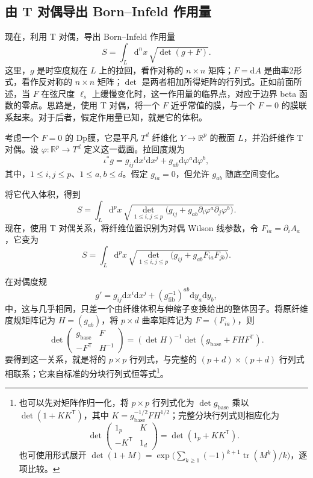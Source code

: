 \subsection{由 T 对偶导出 Born--Infeld 作用量}\label{sec:3.5.5}

现在，利用 T 对偶，导出 Born--Infeld 作用量
\begin{equation}\label{eq:3.162}
S=\int_L\mathrm{d}^nx\,\sqrt{\det(g+F)}.
\end{equation}
这里，$g$ 是时空度规在 $L$ 上的拉回，看作对称的 $n\times n$ 矩阵；$F=\mathrm{d}A$ 是曲率2形式，看作反对称的 $n\times n$ 矩阵；$\det$ 是两者相加所得矩阵的行列式。正如前面所述，当 $F$ 在弦尺度 $\ell_s$ 上缓慢变化时，这一作用量的临界点，对应于边界 beta 函数的零点。思路是，使用 T 对偶，将一个 $F$ 近乎常值的膜，与一个 $F=0$ 的膜联系起来。对于后者，假定作用量已知，就是它的体积。

考虑一个 $F=0$ 的 Dp膜，它是平凡 $T^d$ 纤维化 $Y\to\mathbb{R}^p$ 的截面 $L$，并沿纤维作 T 对偶。设 $\varphi\colon\mathbb{R}^p\to T^d$ 定义这一截面。拉回度规为
\[
\iota^*g=g_{ij}\mathrm{d}x^i\mathrm{d}x^j
+g_{ab}\mathrm{d}\varphi^a\mathrm{d}\varphi^b,
\]
其中，$1\le i,j\le p$、$1\le a,b\le d$。假定 $g_{ia}=0$，但允许 $g_{ab}$ 随底空间变化。

将它代入体积，得到
\[
S=\int_L\mathrm{d}^px\,
\sqrt{\det_{1\le i,j\le p}
\bigl(g_{ij}+g_{ab}\partial_i\varphi^a\partial_j\varphi^b\bigr)}.
\]
现在，使用 T 对偶关系，将纤维位置识别为对偶 Wilson 线参数，令 $F_{ia}=\partial_iA_a$，它变为
\begin{equation}\label{eq:3.163}
S=\int_L\mathrm{d}^px\,
\sqrt{\det_{1\le i,j\le p}
\bigl(g_{ij}+g_{ab}F_{ia}F_{jb}\bigr)}.
\end{equation}

在对偶度规
\[
g'=g_{ij}\mathrm{d}x^i\mathrm{d}x^j
+(g_{\mathrm{fib}}^{-1})^{ab}\mathrm{d}y_a\mathrm{d}y_b,
\]
中，这与几乎相同，只差一个由纤维体积与伸缩子变换给出的整体因子。将原纤维度规矩阵记为 $H=(g_{ab})$，将 $p\times d$ 曲率矩阵记为 $F=(F_{ia})$，则
\[
\det\begin{pmatrix}g_{\mathrm{base}}&F\\-F^{\mathsf{T}}&H^{-1}\end{pmatrix}
=(\det H)^{-1}\det(g_{\mathrm{base}}+FHF^{\mathsf{T}}).
\]
要得到这一关系，就是将的 $p\times p$ 行列式，与完整的 $(p+d)\times(p+d)$ 行列式相联系；它来自标准的分块行列式恒等式\footnote{也可以先对矩阵作归一化，将 $p\times p$ 行列式化为 $\det g_{\mathrm{base}}$ 乘以 $\det(1+KK^{\mathsf T})$，其中 $K=g_{\mathrm{base}}^{-1/2}FH^{1/2}$；完整分块行列式则相应化为
\[
\det\begin{pmatrix}1_p&K\\-K^{\mathsf T}&1_d\end{pmatrix}
=\det(1_p+KK^{\mathsf T}).
\]
也可使用形式展开 $\det(1+M)=\exp\bigl(\sum_{k\ge1}(-1)^{k+1}\operatorname{tr}(M^k)/k\bigr)$，逐项比较。}。

